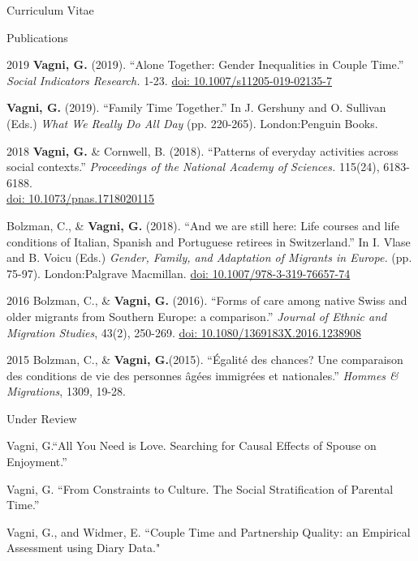 \documentclass[12pt,a4paper]{article}
\begin{document}
\begin{cv}{Curriculum Vitae}
 
 \newpage
 
   \begin{cvlist}{Publications}
	
	 \item [2019] \textbf{Vagni, G.} (2019). ``Alone Together: Gender Inequalities in Couple Time.'' \emph{Social Indicators Research.} 1-23. \href{https://doi.org/10.1007/s11205-019-02135-7}{doi: 10.1007/s11205-019-02135-7} 
	 
		\item [] \textbf{Vagni, G.}  (2019). ``Family Time Together.'' In J. Gershuny and O. Sullivan (Eds.) \emph{What We Really Do All Day} (pp. 220-265). London:Penguin Books.  
		
		
		 \item [2018] \textbf{Vagni, G.} \& Cornwell, B. (2018). ``Patterns of everyday activities across social contexts.'' \emph{Proceedings of the National Academy of Sciences.} 115(24), 6183-6188. \\ \href{https://doi.org/10.1073/pnas.1718020115}{doi: 10.1073/pnas.1718020115} 
		 		  	
		  		    	 	 
		   \item [] Bolzman, C., \& \textbf{Vagni, G.} (2018). ``And we are still here: Life courses and life conditions of Italian, Spanish and Portuguese retirees in Switzerland.'' In I. Vlase and B. Voicu (Eds.) \emph{Gender, Family, and Adaptation of Migrants in Europe.} (pp. 75-97). London:Palgrave Macmillan. \href{https://doi.org/10.1007/978-3-319-76657-7_4}{doi: 10.1007/978-3-319-76657-74} 
  	 	    	 
   	\item [2016] Bolzman, C., \& \textbf{Vagni, G.}  (2016). ``Forms of care among native Swiss and older migrants from Southern Europe: a comparison.'' \emph{Journal of Ethnic and Migration Studies}, 43(2), 250-269. 
   	\href{https://doi.org/10.1080/1369183X.2016.1238908}{doi: 10.1080/1369183X.2016.1238908} 
   	
   	\item [2015]
   	Bolzman, C., \& \textbf{Vagni, G.}(2015). ``{\'E}galit{\'e} des chances? Une
   	comparaison des conditions de vie des personnes {\^a}g{\'e}es immigr{\'e}es
   	et nationales.'' \emph{Hommes \& Migrations}, 1309, 19-28.
   				  
   \end{cvlist}
 
 \begin{cvlist}{Under Review}
 
   \item Vagni, G.``All You Need is Love. Searching for Causal Effects of Spouse on Enjoyment.'' 	
 	\item Vagni, G. ``From Constraints to Culture. The Social Stratification of Parental Time.'' 
 	\item Vagni, G., and Widmer, E. ``Couple Time and Partnership Quality: an Empirical Assessment using Diary Data."
 \end{cvlist}
 

\end{cv}
\end{document}

